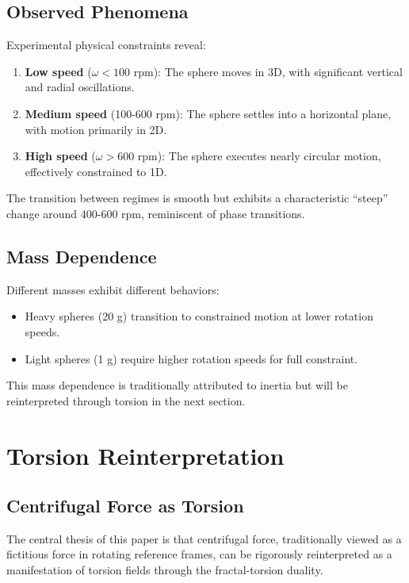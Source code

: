 \documentclass[UTF8]{ctex}\n\documentclass[12pt,a4paper]{article}
\begin{document}
\subsection{Observed Phenomena}

Experimental physical constraints reveal:
\begin{enumerate}
    \item \textbf{Low speed} ($\omega < 100$ rpm): The sphere moves in 3D, with significant vertical and radial oscillations.
    \item \textbf{Medium speed} (100-600 rpm): The sphere settles into a horizontal plane, with motion primarily in 2D.
    \item \textbf{High speed} ($\omega > 600$ rpm): The sphere executes nearly circular motion, effectively constrained to 1D.
\end{enumerate}

The transition between regimes is smooth but exhibits a characteristic ``steep'' change around 400-600 rpm, reminiscent of phase transitions.

\subsection{Mass Dependence}

Different masses exhibit different behaviors:
\begin{itemize}
    \item Heavy spheres (20 g) transition to constrained motion at lower rotation speeds.
    \item Light spheres (1 g) require higher rotation speeds for full constraint.
\end{itemize}

This mass dependence is traditionally attributed to inertia but will be reinterpreted through torsion in the next section.

\section{Torsion Reinterpretation}
\label{sec:dual}

\subsection{Centrifugal Force as Torsion}

The central thesis of this paper is that centrifugal force, traditionally viewed as a fictitious force in rotating reference frames, can be rigorously reinterpreted as a manifestation of torsion fields through the fractal-torsion duality.
\end{document}
